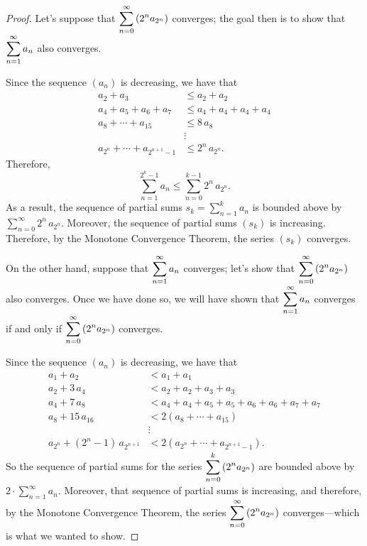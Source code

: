 \begin{proof}
  Let's suppose that $\displaystyle\sum_{n=0}^\infty \left( 2^n a_{2^n} \right)$
  converges; the goal then is to show that $\displaystyle\sum_{n=1}^\infty a_n$
  also converges.

  Since the sequence $(a_n)$ is decreasing, we have that
  \begin{align*}
  a_2 + a_3 &\leq a_2 + a_2 \\
  a_4 + a_5 + a_6 + a_7 &\leq a_4 + a_4 + a_4 + a_4 \\
  a_8 + \cdots + a_{15} &\leq 8 \, a_8 \\
  &\vdots \\
  a_{2^n} + \cdots + a_{2^{n+1} - 1} &\leq 2^n \, a_{2^n}.
  \end{align*}
  Therefore,
  $$
  \sum_{n=1}^{2^k - 1} a_n \leq \sum_{n=0}^{k-1} 2^n \, a_{2^n}.
  $$
  As a result, the sequence of partial sums $s_k = \sum_{n=1}^k a_n$ is bounded above by $\sum_{n=0}^\infty 2^n \, a_{2^n}$.  Moreover, the sequence of partial sums $(s_k)$ is increasing.  Therefore, by the Monotone Convergence Theorem, the series $(s_k)$ converges.

  On the other hand, suppose that $\displaystyle\sum_{n=1}^\infty a_n$ converges; let's show that $\displaystyle\sum_{n=0}^\infty \left( 2^n a_{2^n} \right)$
  also converges.  Once we have done so, we will have shown that  $\displaystyle\sum_{n=1}^\infty a_n$ converges if and only if $\displaystyle\sum_{n=0}^\infty \left( 2^n a_{2^n} \right)$ converges.

  Since the sequence $(a_n)$ is decreasing, we have that
  \begin{align*}
  a_1 + a_2 &< a_1 + a_1 \\
  a_2 + 3\,a_4 &< a_2 + a_2 + a_3 + a_3 \\
  a_4 + 7 \, a_8 &< a_4 + a_4 + a_5 + a_5 + a_6 + a_6 + a_7 + a_7 \\
  a_8 + 15 \, a_{16} &< 2(a_8 + \cdots + a_{15}) \\
  &\vdots \\
  a_{2^n} + (2^n - 1) \, a_{2^{n+1}} &< 2(a_{2^{n}} + \cdots + a_{2^{n+1} - 1}).
  \end{align*}
  So the sequence of partial sums for the series $\displaystyle\sum_{n=0}^k \left( 2^n a_{2^n} \right)$ are bounded above by $2 \cdot \sum_{n=1}^\infty a_n$.  Moreover, that sequence of partial sums is increasing, and therefore, by the Monotone Convergence Theorem, the series $\displaystyle\sum_{n=0}^\infty \left( 2^n a_{2^n} \right)$ converges---which is what we wanted to show.  
\end{proof}

